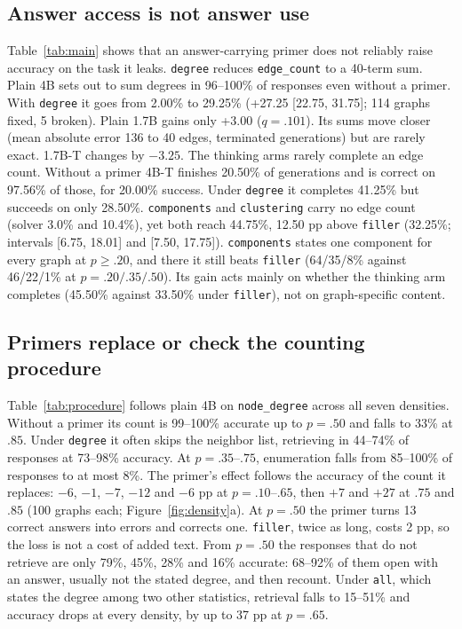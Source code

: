 \documentclass[11pt]{article}
\newcommand{\task}[1]{\texttt{#1}}
\newcommand{\cond}[1]{\texttt{#1}}
\begin{document}
\subsection{Answer access is not answer use}

Table~\ref{tab:main} shows that an answer-carrying primer does not
reliably raise accuracy on the task it leaks. \cond{degree} reduces
\task{edge\_count} to a 40-term sum. Plain 4B sets out to sum degrees in
96--100\% of responses even without a primer. With \cond{degree} it goes
from 2.00\% to 29.25\% (+27.25 [22.75, 31.75]; 114 graphs fixed, 5 broken).
Plain 1.7B gains only +3.00 ($q{=}.101$). Its sums move closer (mean
absolute error 136 to 40 edges, terminated generations) but are rarely
exact. 1.7B-T changes by $-3.25$. The thinking arms rarely complete an edge count. Without a primer 4B-T
finishes 20.50\% of generations and is correct on 97.56\% of those, for
20.00\% success. Under \cond{degree} it completes 41.25\% but succeeds on
only 28.50\%. \cond{components} and \cond{clustering} carry no edge count
(solver 3.0\% and 10.4\%), yet both reach 44.75\%, 12.50 pp above
\cond{filler} (32.25\%; intervals [6.75, 18.01] and [7.50, 17.75]).
\cond{components} states one component for every graph at $p\ge.20$, and
there it still beats \cond{filler} (64/35/8\% against 46/22/1\% at
$p{=}.20/.35/.50$). Its gain acts mainly on whether the thinking
arm completes (45.50\% against 33.50\% under \cond{filler}), not on
graph-specific content.

\subsection{Primers replace or check the counting procedure}
\label{sec:procedure}

Table~\ref{tab:procedure} follows plain 4B on \task{node\_degree} across all
seven densities. Without a primer its count is 99--100\% accurate up to
$p{=}.50$ and falls to 33\% at $.85$. Under
\cond{degree} it often skips the neighbor list, retrieving in 44--74\% of responses
at 73--98\% accuracy. At $p{=}.35$--$.75$, enumeration falls from
85--100\% of responses to at most 8\%. The primer's effect follows the accuracy of
the count it replaces: $-6$, $-1$, $-7$, $-12$ and $-6$ pp at
$p{=}.10$--$.65$, then $+7$ and $+27$ at $.75$ and $.85$ (100 graphs each;
Figure~\ref{fig:density}a). At $p{=}.50$ the primer turns 13 correct answers
into errors and corrects one. \cond{filler}, twice as long, costs 2 pp, so
the loss is not a cost of added text. From $p{=}.50$ the responses that do
not retrieve are only 79\%, 45\%, 28\% and 16\% accurate: 68--92\% of them
open with an answer, usually not the stated degree, and then recount.
Under \cond{all}, which states the degree among two other statistics,
retrieval falls to 15--51\% and accuracy drops at every density, by up to 37 pp at
$p{=}.65$.
\end{document}
